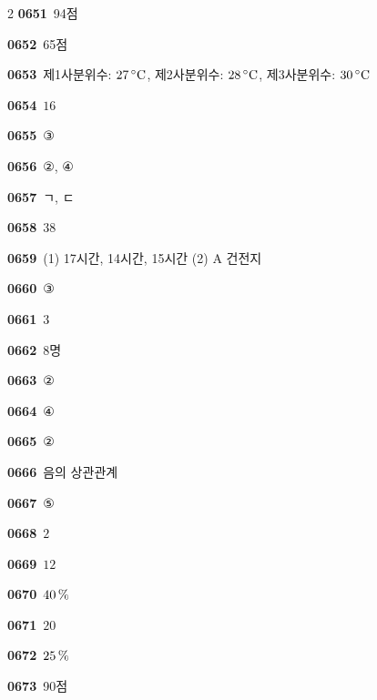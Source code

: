 \documentclass[10pt,a4paper]{article}
\newcommand{\pt}[1]{\mathrm{#1}}
\begin{document}
\begin{multicols}{2}
\noindent\textbf{0651}\ 94점\par
\noindent\textbf{0652}\ 65점\par
\noindent\textbf{0653}\ 제1사분위수: $27\mkern3mu {}^\circ\mathrm{C}$, 제2사분위수: $28\mkern3mu {}^\circ\mathrm{C}$, 제3사분위수: $30\mkern3mu {}^\circ\mathrm{C}$\par
\noindent\textbf{0654}\ $16$\par
\noindent\textbf{0655}\ ③\par
\noindent\textbf{0656}\ ②, ④\par
\noindent\textbf{0657}\ ㄱ, ㄷ\par
\noindent\textbf{0658}\ $38$\par
\noindent\textbf{0659}\ (1) 17시간, 14시간, 15시간 (2) $\pt{A}$ 건전지\par
\noindent\textbf{0660}\ ③\par
\noindent\textbf{0661}\ $3$\par
\noindent\textbf{0662}\ 8명\par
\noindent\textbf{0663}\ ②\par
\noindent\textbf{0664}\ ④\par
\noindent\textbf{0665}\ ②\par
\noindent\textbf{0666}\ 음의 상관관계\par
\noindent\textbf{0667}\ ⑤\par
\noindent\textbf{0668}\ $2$\par
\noindent\textbf{0669}\ $12$\par
\noindent\textbf{0670}\ $40\mkern3mu \%$\par
\noindent\textbf{0671}\ $20$\par
\noindent\textbf{0672}\ $25\mkern3mu \%$\par
\noindent\textbf{0673}\ 90점\par
\end{multicols}
\end{document}
